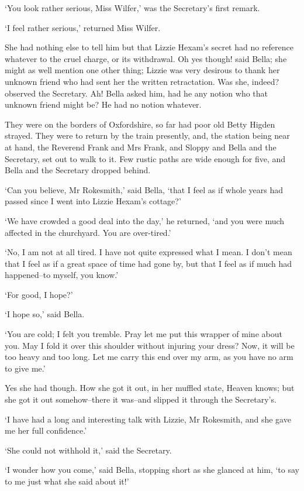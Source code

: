 ‘You look rather serious, Miss Wilfer,’ was the Secretary’s first
remark.

‘I feel rather serious,’ returned Miss Wilfer.

She had nothing else to tell him but that Lizzie Hexam’s secret had
no reference whatever to the cruel charge, or its withdrawal. Oh yes
though! said Bella; she might as well mention one other thing; Lizzie
was very desirous to thank her unknown friend who had sent her the
written retractation. Was she, indeed? observed the Secretary. Ah! Bella
asked him, had he any notion who that unknown friend might be? He had no
notion whatever.

They were on the borders of Oxfordshire, so far had poor old Betty
Higden strayed. They were to return by the train presently, and, the
station being near at hand, the Reverend Frank and Mrs Frank, and Sloppy
and Bella and the Secretary, set out to walk to it. Few rustic paths are
wide enough for five, and Bella and the Secretary dropped behind.

‘Can you believe, Mr Rokesmith,’ said Bella, ‘that I feel as if whole
years had passed since I went into Lizzie Hexam’s cottage?’

‘We have crowded a good deal into the day,’ he returned, ‘and you were
much affected in the churchyard. You are over-tired.’

‘No, I am not at all tired. I have not quite expressed what I mean. I
don’t mean that I feel as if a great space of time had gone by, but that
I feel as if much had happened--to myself, you know.’

‘For good, I hope?’

‘I hope so,’ said Bella.

‘You are cold; I felt you tremble. Pray let me put this wrapper of mine
about you. May I fold it over this shoulder without injuring your dress?
Now, it will be too heavy and too long. Let me carry this end over my
arm, as you have no arm to give me.’

Yes she had though. How she got it out, in her muffled state, Heaven
knows; but she got it out somehow--there it was--and slipped it through
the Secretary’s.

‘I have had a long and interesting talk with Lizzie, Mr Rokesmith, and
she gave me her full confidence.’

‘She could not withhold it,’ said the Secretary.

‘I wonder how you come,’ said Bella, stopping short as she glanced at
him, ‘to say to me just what she said about it!’

